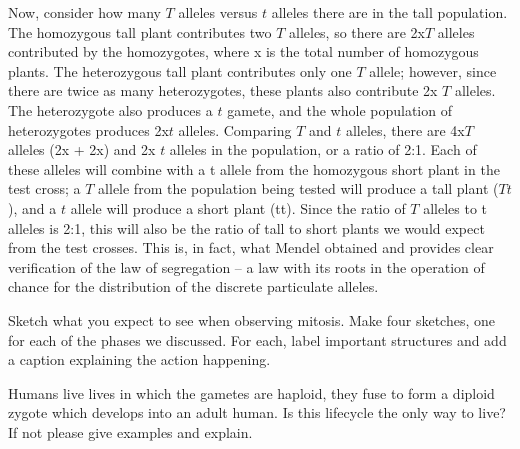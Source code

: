 \documentclass[exam,addpoints,noanswers]{exam}
\begin{document}
\begin{questions}
\begin{solution}
Now, consider how many $T$ alleles versus $t$ alleles there are in the tall population. The homozygous tall plant contributes two $T$ alleles, so there are 2x$T$ alleles contributed by the homozygotes, where x is the total number of homozygous plants. The heterozygous tall plant contributes only one $T$ allele; however, since there are twice as many heterozygotes, these plants also contribute 2x $T$ alleles. The heterozygote also produces a $t$ gamete, and the whole population of heterozygotes produces 2x$t$ alleles. Comparing $T$ and $t$ alleles, there are 4x$T$ alleles (2x + 2x) and 2x $t$ alleles in the population, or a ratio of 2:1. Each of these alleles will combine with a t allele from the homozygous short plant in the test cross; a $T$ allele from the population being tested will produce a tall plant ($Tt$), and a $t$ allele will produce a short plant (tt). Since the ratio of $T$ alleles to t alleles is 2:1, this will also be the ratio of tall to short plants we would expect from the test crosses. This is, in fact, what Mendel obtained and provides clear verification of the law of segregation -- a law with its roots in the operation of chance for the distribution of the discrete particulate alleles.
\end{solution}

\clearpage
\question[23] Sketch what you expect to see when observing mitosis. Make four sketches, one for each of the phases we discussed. For each, label important structures and add a caption explaining the action happening. 

\clearpage
\question[22] Humans live lives in which the gametes are haploid, they fuse to form a diploid zygote which develops into an adult human.  Is this lifecycle the only way to live? If not please give examples and explain. 


\end{questions}
\end{document}
